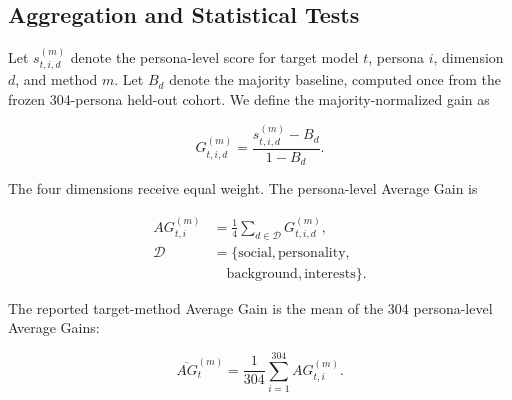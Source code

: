 \documentclass{ieeeaccess}
\begin{document}
\subsection{Aggregation and Statistical Tests}
\label{sec:metrics}


Let $s_{t,i,d}^{(m)}$ denote the persona-level score for target model $t$, persona $i$,
dimension $d$, and method $m$. Let $B_d$ denote the majority baseline, computed once from
the frozen 304-persona held-out cohort. We define the majority-normalized gain as

\begin{equation}
G_{t,i,d}^{(m)} = \frac{s_{t,i,d}^{(m)} - B_d}{1-B_d}.
\end{equation}

The four dimensions receive equal weight. The persona-level Average Gain is

\begin{equation}
\begin{aligned}
AG_{t,i}^{(m)}
&= \frac{1}{4}\sum_{d\in\mathcal{D}}G_{t,i,d}^{(m)},\\
\mathcal{D}
&= \{\mathrm{social},\mathrm{personality},\\[-1mm]
&\quad \mathrm{background},\mathrm{interests}\}.
\end{aligned}
\end{equation}

The reported target-method Average Gain is the mean of the 304 persona-level Average Gains:

\begin{equation}
\overline{AG}_{t}^{(m)} = \frac{1}{304}\sum_{i=1}^{304}AG_{t,i}^{(m)}.
\end{equation}
\end{document}
